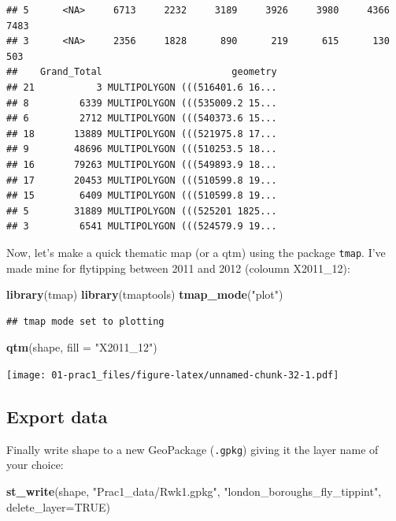 \documentclass[]{book}
\newenvironment{Shaded}{\begin{snugshade}}{\end{snugshade}}
\newcommand{\DataTypeTok}[1]{\textcolor[rgb]{0.13,0.29,0.53}{#1}}
\newcommand{\KeywordTok}[1]{\textcolor[rgb]{0.13,0.29,0.53}{\textbf{#1}}}
\newcommand{\NormalTok}[1]{#1}
\newcommand{\OtherTok}[1]{\textcolor[rgb]{0.56,0.35,0.01}{#1}}
\newcommand{\StringTok}[1]{\textcolor[rgb]{0.31,0.60,0.02}{#1}}
\begin{document}
\begin{verbatim}
## 5      <NA>     6713     2232     3189     3926     3980     4366     7483
## 3      <NA>     2356     1828      890      219      615      130      503
##    Grand_Total                       geometry
## 21           3 MULTIPOLYGON (((516401.6 16...
## 8         6339 MULTIPOLYGON (((535009.2 15...
## 6         2712 MULTIPOLYGON (((540373.6 15...
## 18       13889 MULTIPOLYGON (((521975.8 17...
## 9        48696 MULTIPOLYGON (((510253.5 18...
## 16       79263 MULTIPOLYGON (((549893.9 18...
## 17       20453 MULTIPOLYGON (((510599.8 19...
## 15        6409 MULTIPOLYGON (((510599.8 19...
## 5        31889 MULTIPOLYGON (((525201 1825...
## 3         6541 MULTIPOLYGON (((524579.9 19...
\end{verbatim}

Now, let's make a quick thematic map (or a qtm) using the package \texttt{tmap}. I've made mine for flytipping between 2011 and 2012 (coloumn X2011\_12):

\begin{Shaded}
\begin{Highlighting}[]
\KeywordTok{library}\NormalTok{(tmap)}
\KeywordTok{library}\NormalTok{(tmaptools)}
\KeywordTok{tmap_mode}\NormalTok{(}\StringTok{"plot"}\NormalTok{)}
\end{Highlighting}
\end{Shaded}

\begin{verbatim}
## tmap mode set to plotting
\end{verbatim}

\begin{Shaded}
\begin{Highlighting}[]
\KeywordTok{qtm}\NormalTok{(shape, }\DataTypeTok{fill =} \StringTok{"X2011_12"}\NormalTok{)}
\end{Highlighting}
\end{Shaded}

\texttt{[image: 01-prac1\_files/figure-latex/unnamed-chunk-32-1.pdf]}

\hypertarget{export-data-2}{%
\subsection{Export data}\label{export-data-2}}

Finally write shape to a new GeoPackage (\texttt{.gpkg}) giving it the layer name of your choice:

\begin{Shaded}
\begin{Highlighting}[]
\KeywordTok{st_write}\NormalTok{(shape, }\StringTok{"Prac1_data/Rwk1.gpkg"}\NormalTok{, }\StringTok{"london_boroughs_fly_tippint"}\NormalTok{, }\DataTypeTok{delete_layer=}\OtherTok{TRUE}\NormalTok{)}
\end{Highlighting}
\end{Shaded}
\end{document}
